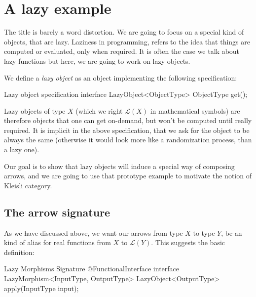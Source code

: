 \documentclass[12pt,a4paper]{report}
\renewcommand{\baselinestretch}{1.5}
\theoremstyle{theorem}
\theoremstyle{definition}
\begin{document}
\section{A lazy example}

The title is barely a word distortion.
We are going to focus on a special kind of
objects, that are lazy.
Laziness in programming, refers to the idea that things are computed
or evaluated, only when required. It is often the case we talk about
lazy functions but here, we are going to work on lazy objects.

We define a \emph{lazy object} as an object implementing the following
specification:

\renewcommand{\baselinestretch}{1} 
\selectfont

\begin{javacode}{Lazy object specification}
interface LazyObject<ObjectType>
{
  ObjectType get();
}
\end{javacode}

\renewcommand{\baselinestretch}{1.5} 
\selectfont

Lazy objects of type $X$ (which we right $\mathcal{L}(X)$ in
mathematical symbols) are therefore objects that one can get on-demand,
but won't be computed until really required. It is implicit in the above
specification, that we ask for the object to be always the same
(otherwise it would look more like a randomization process, than a lazy one).

Our goal is to show that lazy objects will induce a special way of composing
arrows, and we are going to use that prototype example to motivate
the notion of Kleisli category.

\subsection{The arrow signature}

As we have discussed above, we want our arrows from type $X$ to type $Y$,
be an kind of alias for real functions from $X$ to $\mathcal{L}(Y)$.
This suggests the basic definition:

\renewcommand{\baselinestretch}{1} 
\selectfont

\begin{javacode}{Lazy Morphisms Signature}
@FunctionalInterface
interface LazyMorphism<InputType, OutputType>
{
  LazyObject<OutputType> apply(InputType input);
}
\end{javacode}

\renewcommand{\baselinestretch}{1.5} 
\selectfont
\end{document}
